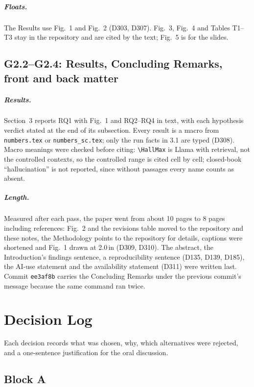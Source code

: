 \documentclass[11pt,a4paper]{report}
\begin{document}
\paragraph{Floats.} The Results use Fig.~1 and Fig.~2 (D303, D307). Fig.~3, Fig.~4 and Tables T1--T3 stay in the
repository and are cited by the text; Fig.~5 is for the slides.

\section{G2.2--G2.4: Results, Concluding Remarks, front and back matter}

\paragraph{Results.} Section~3 reports RQ1 with Fig.~1 and RQ2--RQ4 in text, with each hypothesis verdict
stated at the end of its subsection. Every result is a macro from \texttt{numbers.tex} or \texttt{numbers\_sc.tex};
only the run facts in 3.1 are typed (D308). Macro meanings were checked before citing: \verb|\HallMax| is Llama
with retrieval, not the controlled contexts, so the controlled range is cited cell by cell; closed-book
``hallucination'' is not reported, since without passages every name counts as absent.

\paragraph{Length.} Measured after each pass, the paper went from about 10 pages to 8 pages including references:
Fig.~2 and the revisions table moved to the repository and these notes, the Methodology points to the repository
for details, captions were shortened and Fig.~1 drawn at 2.0\,in (D309, D310). The abstract, the Introduction's
findings sentence, a reproducibility sentence (D135, D139, D185), the AI-use statement and the availability
statement (D311) were written last. Commit \texttt{ee3af8b} carries the Concluding Remarks under the previous
commit's message because the same command ran twice.


\chapter{Decision Log}\label{ch:decisions}
Each decision records what was chosen, why, which alternatives were
rejected, and a one-sentence justification for the oral discussion.

\section{Block A}\label{sec:decisions-a}
\end{document}
